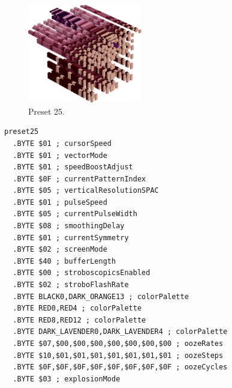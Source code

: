 \begin{minipage}[b]{0.48\linewidth}
\begin{figure}[H]                                                          
  \centering                                                             
  \begin{adjustbox}{width=5cm,center}                                   
  \includegraphics[width=5cm]{src/colorspace_presets/preset25-45.png}%
  \end{adjustbox}                                                        
\caption*{Preset 25.}                                           
\end{figure}                                                               
\end{minipage}
\hspace{0.1cm}
\begin{minipage}[b]{0.48\linewidth}                                       
\begin{lstlisting}[basicstyle=\ttfamily\tiny]
preset25
  .BYTE $01 ; cursorSpeed
  .BYTE $01 ; vectorMode
  .BYTE $01 ; speedBoostAdjust
  .BYTE $0F ; currentPatternIndex
  .BYTE $05 ; verticalResolutionSPAC
  .BYTE $01 ; pulseSpeed
  .BYTE $05 ; currentPulseWidth
  .BYTE $08 ; smoothingDelay
  .BYTE $01 ; currentSymmetry
  .BYTE $02 ; screenMode
  .BYTE $40 ; bufferLength
  .BYTE $00 ; stroboscopicsEnabled
  .BYTE $02 ; stroboFlashRate
  .BYTE BLACK0,DARK_ORANGE13 ; colorPalette
  .BYTE RED0,RED4 ; colorPalette
  .BYTE RED8,RED12 ; colorPalette
  .BYTE DARK_LAVENDER0,DARK_LAVENDER4 ; colorPalette
  .BYTE $07,$00,$00,$00,$00,$00,$00,$00 ; oozeRates
  .BYTE $10,$01,$01,$01,$01,$01,$01,$01 ; oozeSteps
  .BYTE $0F,$0F,$0F,$0F,$0F,$0F,$0F,$0F ; oozeCycles
  .BYTE $03 ; explosionMode
\end{lstlisting}
\end{minipage}


